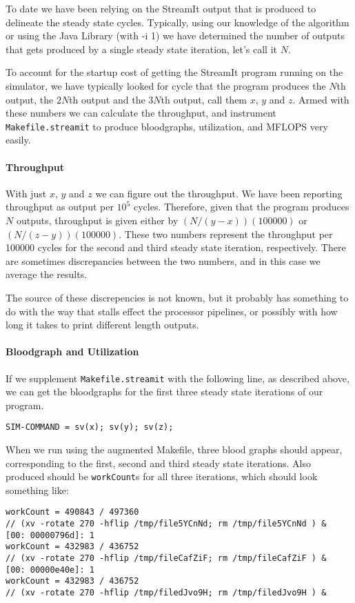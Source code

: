 To date we have been relying on the StreamIt output that is produced 
to delineate the steady state cycles. Typically, using our knowledge of
the algorithm or using the Java Library (with -i 1) we have determined the
number of outputs that gets produced by a single steady state iteration, let's call
it $N$.

To account for the startup cost of getting the StreamIt program running on
the simulator, we have typically looked for cycle that the program produces
the $N$th output, the $2N$th output and the $3N$th output, call them $x$, $y$ and $z$. 
Armed with these numbers we can calculate the throughput, and instrument
\texttt{Makefile.streamit} to produce bloodgraphs, utilization, and MFLOPS very easily. 

\paragraph{Throughput} 
With just $x$, $y$ and $z$ we can figure out the throughput. We have been reporting
throughput as output per $10^5$ cycles. Therefore, given that the program produces
$N$ outputs, throughput is given either by $(N/(y-x))(100000)$ or $(N/(z-y))(100000)$.
These two numbers represent the throughput per 100000 cycles for the second and third
steady state iteration, respectively. There are sometimes discrepancies between the two 
numbers, and in this case we average the results.

The source of these discrepencies is not known, but it probably has something to do with
the way that stalls effect the processor pipelines, or possibly with how long it takes to
print different length outputs.

\paragraph{Bloodgraph and Utilization} 
If we supplement \texttt{Makefile.streamit} with the following line, as described above,
we can get the bloodgraphs for the first three steady state iterations of
our program.
\begin{verbatim}SIM-COMMAND = sv(x); sv(y); sv(z);\end{verbatim} 

When we run using the augmented Makefile, three blood graphs should appear, 
corresponding to the first, second and third steady state iterations.
Also produced should be \texttt{workCount}s for all three iterations, which
should look something like:
\begin{verbatim}
workCount = 490843 / 497360
// (xv -rotate 270 -hflip /tmp/file5YCnNd; rm /tmp/file5YCnNd ) &
[00: 00000796d]: 1
workCount = 432983 / 436752
// (xv -rotate 270 -hflip /tmp/fileCafZiF; rm /tmp/fileCafZiF ) &
[00: 00000e40e]: 1
workCount = 432983 / 436752
// (xv -rotate 270 -hflip /tmp/filedJvo9H; rm /tmp/filedJvo9H ) &
\end{verbatim} 


